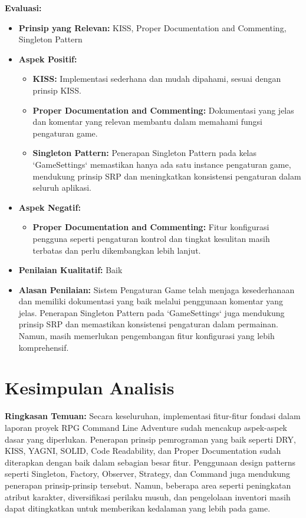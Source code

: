\documentclass[12pt]{article}
\begin{document}
\textbf{Evaluasi:}
\begin{itemize}
    \item \textbf{Prinsip yang Relevan:} KISS, Proper Documentation and Commenting, Singleton Pattern
    \item \textbf{Aspek Positif:}
    \begin{itemize}
        \item \textbf{KISS:} Implementasi sederhana dan mudah dipahami, sesuai dengan prinsip KISS.
        \item \textbf{Proper Documentation and Commenting:} Dokumentasi yang jelas dan komentar yang relevan membantu dalam memahami fungsi pengaturan game.
        \item \textbf{Singleton Pattern:} Penerapan Singleton Pattern pada kelas `GameSettings` memastikan hanya ada satu instance pengaturan game, mendukung prinsip SRP dan meningkatkan konsistensi pengaturan dalam seluruh aplikasi.
    \end{itemize}
    \item \textbf{Aspek Negatif:}
    \begin{itemize}
        \item \textbf{Proper Documentation and Commenting:} Fitur konfigurasi pengguna seperti pengaturan kontrol dan tingkat kesulitan masih terbatas dan perlu dikembangkan lebih lanjut.
    \end{itemize}
    \item \textbf{Penilaian Kualitatif:} Baik
    \item \textbf{Alasan Penilaian:} Sistem Pengaturan Game telah menjaga kesederhanaan dan memiliki dokumentasi yang baik melalui penggunaan komentar yang jelas. Penerapan Singleton Pattern pada `GameSettings` juga mendukung prinsip SRP dan memastikan konsistensi pengaturan dalam permainan. Namun, masih memerlukan pengembangan fitur konfigurasi yang lebih komprehensif.
\end{itemize}

\section{Kesimpulan Analisis}
\textbf{Ringkasan Temuan:} Secara keseluruhan, implementasi fitur-fitur fondasi dalam laporan proyek RPG Command Line Adventure sudah mencakup aspek-aspek dasar yang diperlukan. Penerapan prinsip pemrograman yang baik seperti DRY, KISS, YAGNI, SOLID, Code Readability, dan Proper Documentation sudah diterapkan dengan baik dalam sebagian besar fitur. Penggunaan design patterns seperti Singleton, Factory, Observer, Strategy, dan Command juga mendukung penerapan prinsip-prinsip tersebut. Namun, beberapa area seperti peningkatan atribut karakter, diversifikasi perilaku musuh, dan pengelolaan inventori masih dapat ditingkatkan untuk memberikan kedalaman yang lebih pada game.
\end{document}
